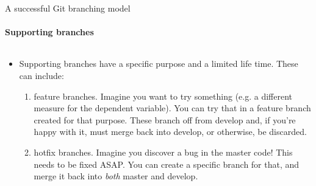 \documentclass[10pt, aspectratio=169, xcolor=dvipsnames]{beamer}
\let\olditem\item
\renewcommand{\item}{%
\olditem\vspace{0.3em}}
\begin{document}
\begin{frame}[t]{A successful Git branching model}
    \framesubtitle{Supporting branches}

    \normalsize\vspace{0.5em}
    \begin{columns}
        \begin{column}[t]{0.7\textwidth}
            \begin{itemize}
                \item Supporting branches have a specific purpose and a limited life time. These can include:
                \begin{enumerate}
                    \item \alert{feature} branches. Imagine you want to try something (e.g. a different measure for the dependent variable). You can try that in a feature branch created for that purpose. These branch off from \alert{develop} and, if you're happy with it, must merge back into \alert{develop}, or otherwise, be discarded.
                    \item \alert{hotfix} branches. Imagine you discover a bug in the \alert{master} code! This needs to be fixed ASAP. You can create a specific branch for that, and merge it back into \textit{both} \alert{master} and \alert{develop}.
                \end{enumerate}
            \end{itemize}    
        \end{column}


\end{columns}
\end{frame}
\end{document}
